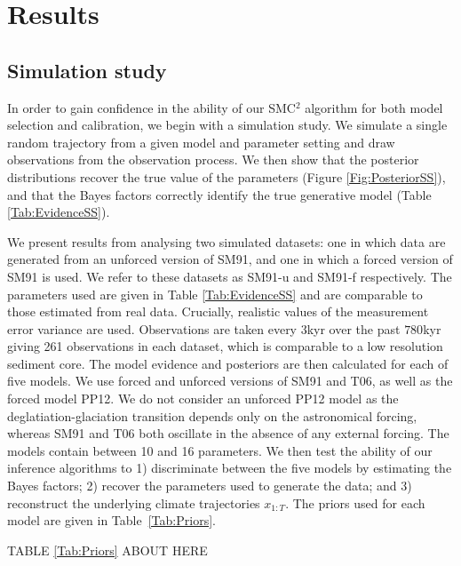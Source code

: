 \documentclass[a4paper,12pt]{article}
\begin{document}
\clearpage
\section{Results}
\label{Sec:Results}




\subsection{Simulation study}
In order to gain confidence in the ability of our SMC$^2$ algorithm for both model selection and calibration, we begin with a simulation study.
We simulate a single random trajectory from a given model and parameter setting and draw observations from the observation process. We then show that the posterior distributions recover the true value of the parameters (Figure \ref{Fig:PosteriorSS}), and that the Bayes factors correctly identify the true generative model (Table \ref{Tab:EvidenceSS}).

We present results from analysing two simulated datasets: one in which data are generated from an unforced version of SM91, and one in which a forced version of SM91 is used. 
We refer to these datasets as SM91-u and SM91-f respectively. The parameters used are given in Table \ref{Tab:EvidenceSS} and are comparable to those estimated from real data. Crucially, realistic values of the measurement error variance are used. 
Observations are taken every $3$kyr over the past $780$kyr giving 261 observations in each dataset, which  is comparable to a  low resolution sediment core.
The model evidence and posteriors are then calculated for  each of five models. We use  forced and unforced versions of SM91 and T06, as well as the forced model PP12. We do not consider an unforced PP12 model as the deglatiation-glaciation transition depends only on the astronomical forcing, whereas SM91 and T06 both oscillate in the absence of any external forcing. The models contain between 10 and 16 parameters. We then test the ability of  our inference algorithms to 1) discriminate between the five models by  estimating  the Bayes factors; 2) recover the parameters used to generate the data; and 3) reconstruct the underlying climate trajectories $x_{1:T}$.
The priors used for each model are given in Table~\ref{Tab:Priors}.


\begin{center}
\begin{LARGE}
TABLE \ref{Tab:Priors} ABOUT HERE
\end{LARGE}
\end{center}
\end{document}
